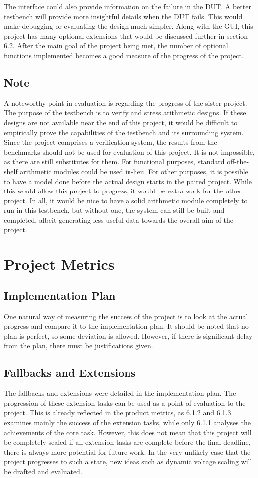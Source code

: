 The interface could also provide information on the failure in the DUT.
A better testbench will provide more insightful details when the DUT fails.
This would make debugging or evaluating the design much simpler.
Along with the GUI, this project has many optional extensions that would be discussed further in section 6.2.
After the main goal of the project being met, the number of optional functions implemented becomes a good measure of the progress of the project.

\subsection{Note}
A noteworthy point in evaluation is regarding the progress of the sister project.
The purpose of the testbench is to verify and stress arithmetic designs.
If these designs are not available near the end of this project, it would be difficult to empirically prove the capabilities of the testbench and its surrounding system.
Since the project comprises a verification system, the results from the benchmarks should not be used for evaluation of this project.
It is not impossible, as there are still substitutes for them.
For functional purposes, standard off-the-shelf arithmetic modules could be used in-lieu.
For other purposes, it is possible to have a model done before the actual design starts in the paired project.
While this would allow this project to progress, it would be extra work for the other project.
In all, it would be nice to have a solid arithmetic module completely to run in this testbench, but without one, the system can still be built and completed, albeit generating less useful data towards the overall aim of the project.

\section{Project Metrics}
\subsection{Implementation Plan}
One natural way of measuring the success of the project is to look at the actual progress and compare it to the implementation plan.
It should be noted that no plan is perfect, so some deviation is allowed.
However, if there is significant delay from the plan, there must be justifications given.

\subsection{Fallbacks and Extensions}
The fallbacks and extensions were detailed in the implementation plan.
The progression of these extension tasks can be used as a point of evaluation to the project.
This is already reflected in the product metrics, as 6.1.2 and 6.1.3 examines mainly the success of the extension tasks, while only 6.1.1 analyses the achievements of the core task.
However, this does not mean that this project will be completely sealed if all extension tasks are complete before the final deadline, there is always more potential for future work.
In the very unlikely case that the project progresses to such a state, new ideas such as dynamic voltage scaling will be drafted and evaluated.
